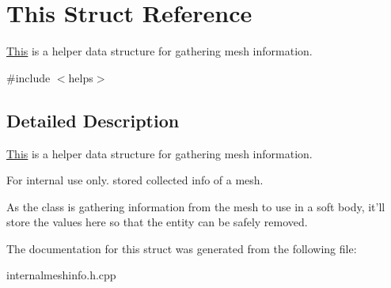\hypertarget{structThis}{
\section{This Struct Reference}
\label{d3/d63/structThis}
}


\hyperlink{structThis}{This} is a helper data structure for gathering mesh information.  




{\ttfamily \#include $<$helps$>$}



\subsection{Detailed Description}
\hyperlink{structThis}{This} is a helper data structure for gathering mesh information. \begin{DoxyInternal}{For internal use only.}
stored collected info of a mesh.

As the class is gathering information from the mesh to use in a soft body, it'll store the values here so that the entity can be safely removed. \end{DoxyInternal}


The documentation for this struct was generated from the following file:\begin{DoxyCompactItemize}
\item 
internalmeshinfo.h.cpp\end{DoxyCompactItemize}
